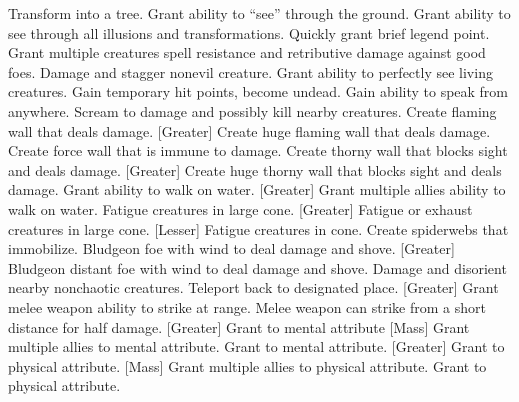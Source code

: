     {Transform into a tree.}
    {Grant ability to ``see'' through the ground.}
    {Grant ability to see through all illusions and transformations.}
    {Quickly grant brief legend point.}
    {Grant multiple creatures spell resistance and retributive damage against good foes.}
    {Damage and stagger nonevil creature.}
    {Grant ability to perfectly see living creatures.}
    {Gain temporary hit points, become undead.}
    {Gain ability to speak from anywhere.}
    {Scream to damage and possibly kill nearby creatures.}
    {Create flaming wall that deals damage.}
[Greater]
    {Create huge flaming wall that deals damage.}
    {Create force wall that is immune to damage.}
    {Create thorny wall that blocks sight and deals damage.}
[Greater]
    {Create huge thorny wall that blocks sight and deals damage.}
    {Grant ability to walk on water.}
[Greater]
    {Grant multiple allies ability to walk on water.}
    {Fatigue creatures in large cone.}
[Greater]
    {Fatigue or exhaust creatures in large cone.}
[Lesser]
    {Fatigue creatures in cone.}
    {Create spiderwebs that immobilize.}
    {Bludgeon foe with wind to deal damage and shove.}
[Greater]
    {Bludgeon distant foe with wind to deal damage and shove.}
    {Damage and disorient nearby nonchaotic creatures.}
    {Teleport back to designated place.}
[Greater]
    {Grant melee weapon ability to strike at range.}
    {Melee weapon can strike from a short distance for half damage.}
[Greater]
    {Grant  to mental attribute}
[Mass]
    {Grant multiple allies  to mental attribute.}
    {Grant  to mental attribute.}
[Greater]
    {Grant  to physical attribute.}
[Mass]
    {Grant multiple allies  to physical attribute.}
    {Grant  to physical attribute.}

